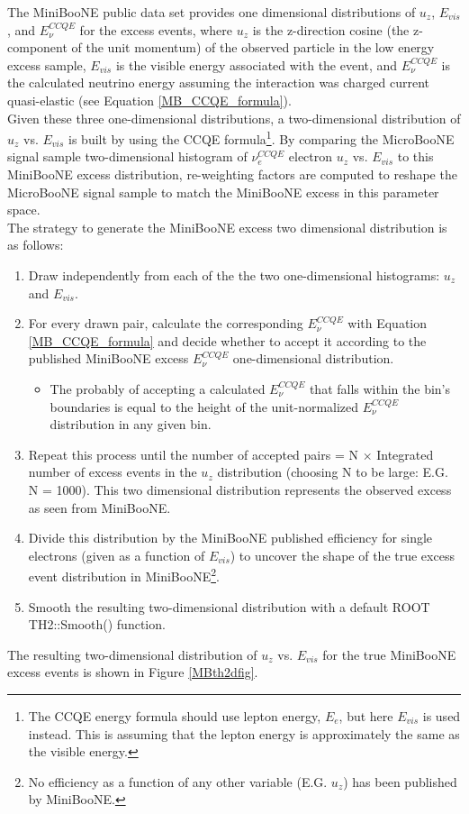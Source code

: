 The MiniBooNE public data set \cite{MB_lee_datarelease} provides one dimensional distributions of $u_z$, $E_{vis}$, and $E_\nu^{CCQE}$ for the excess events, where $u_z$ is the z-direction cosine (the z- component of the unit momentum) of the observed particle in the low energy excess sample, $E_{vis}$ is the visible energy associated with the event, and $E_{\nu}^{CCQE}$ is the calculated neutrino energy assuming the interaction was charged current quasi-elastic (see Equation \ref{MB_CCQE_formula}).\\

Given these three one-dimensional distributions, a two-dimensional distribution of $u_z$ vs. $E_{vis}$ is built by using the CCQE formula\footnote{The CCQE energy formula should use lepton energy, $E_e$, but here $E_{vis}$ is used instead. This is assuming that the lepton energy is approximately the same as the visible energy.}. By comparing the MicroBooNE signal sample two-dimensional histogram of $\nu_e^{CCQE}$ electron $u_z$ vs. $E_{vis}$ to this MiniBooNE excess distribution, re-weighting factors are computed to reshape the MicroBooNE signal sample to match the MiniBooNE excess in this parameter space.\\

The strategy to generate the MiniBooNE excess two dimensional distribution is as follows:
\begin{enumerate}
\item Draw independently from each of the the two one-dimensional histograms: $u_z$ and $E_{vis}$.
\item For every drawn pair, calculate the corresponding $E_\nu^{CCQE}$ with Equation \ref{MB_CCQE_formula} and decide whether to accept it according to the published MiniBooNE excess $E_\nu^{CCQE}$ one-dimensional distribution.
	\begin{itemize}
	\item The probably of accepting a calculated $E_\nu^{CCQE}$ that falls within the bin's boundaries is equal to the height of the unit-normalized $E_\nu^{CCQE}$ distribution in any given bin.
	\end{itemize}
\item Repeat this process until the number of accepted pairs = N $\times$ Integrated number of excess events in the $u_z$ distribution (choosing N to be large: E.G. N = 1000). This two dimensional distribution represents the observed excess as seen from MiniBooNE.
\item Divide this distribution by the MiniBooNE published efficiency for single electrons (given as a function of $E_{vis}$) to uncover the shape of the true excess event distribution in MiniBooNE\footnote{No efficiency as a function of any other variable (E.G. $u_z$) has been published by MiniBooNE.}.
\item Smooth the resulting two-dimensional distribution with a default ROOT TH2::Smooth() function.
\end{enumerate}
The resulting two-dimensional distribution of $u_z$ vs. $E_{vis}$ for the true MiniBooNE excess events is shown in Figure \ref{MBth2dfig}.


